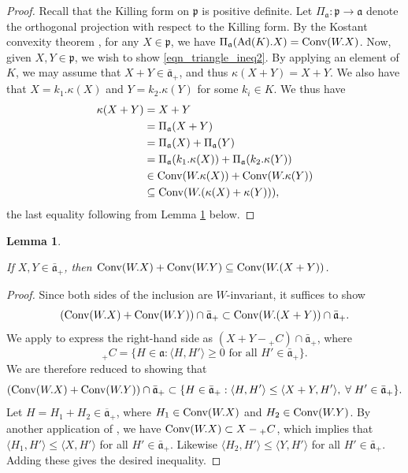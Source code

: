 \documentclass[12pt]{amsart}
\newtheorem{lemma}[theorem]{Lemma}
\theoremstyle{remark}
\newcommand{\ga}{\mathfrak a}
\begin{document}
\begin{proof}
    Recall that the Killing form on $\mathfrak{p}$ is positive definite. Let $\Pi_\ga: \mathfrak{p} \to \ga$ denote the orthogonal projection with respect to the Killing form. By the Kostant convexity theorem \cite[Theorem 8.2]{Kostant_73}, for any $X \in \mathfrak{p}$, we have $\Pi_\ga(\textnormal{Ad}(K).X) = \textnormal{Conv}(W. X)$. Now, given $X, Y \in \mathfrak{p}$, we wish to show \eqref{eqn_triangle_ineq2}. By applying an element of $K$, we may assume that $X + Y \in \bar{\ga}_+$, and thus $\kappa(X + Y) = X + Y$. We also have that $X = k_1.\kappa(X)$ and $Y = k_2.\kappa(Y)$ for some $k_i \in K$. We thus have
    \begin{align*}
        \kappa(X + Y) &= X+Y \\
                    &= \Pi_\ga(X + Y) \\
                    &= \Pi_\ga(X) + \Pi_\ga(Y) \\
                    &= \Pi_\ga(k_1.\kappa(X)) + \Pi_\ga(k_2.\kappa(Y)) \\
                    & \in \textnormal{Conv}(W.\kappa(X)) + \textnormal{Conv}(W.\kappa(Y)) \\
                    & \subseteq \textnormal{Conv}(W.(\kappa(X) + \kappa(Y))),
    \end{align*}
the last equality following from Lemma \ref{lemma:conv-sum} below.
\end{proof}

\begin{lemma}\label{lemma:conv-sum}

If $X, Y \in \bar{\ga}_+$, then $\textnormal{Conv}(W.X) + \textnormal{Conv}(W.Y) \subseteq \textnormal{Conv}(W.(X+Y))$.

\end{lemma}

\begin{proof}

Since both sides of the inclusion are $W$-invariant, it suffices to show
\[
(\textnormal{Conv}(W.X) + \textnormal{Conv}(W.Y)) \cap \bar{\ga}_+\subset \textnormal{Conv}(W.(X+Y)) \cap \bar{\ga}_+.
\]
We apply \cite[Ch. IV, \S 8, Lemma 8.3]{Helgason_00} to express the right-hand side as $(X + Y - {}_+ C) \cap \bar{\ga}_+$, where
\[
{}_+ C = \{ H \in \ga : \langle H, H' \rangle \ge 0 \text{ for all } H' \in \bar{\ga}_+ \}.
\]
We are therefore reduced to showing that
\[
(\textnormal{Conv}(W.X) + \textnormal{Conv}(W.Y)) \cap \bar{\ga}_+\subset \{H\in \bar{\ga}_+: \langle H, H' \rangle \le \langle X+Y, H' \rangle,\; \forall\; H' \in \bar{\ga}_+\}.
\]
Let $H = H_1 + H_2\in\overline{\ga}_+$, where $H_1 \in \textnormal{Conv}(W.X)$ and $H_2 \in \textnormal{Conv}(W.Y)$.  By another application of \cite[Ch. IV, \S 8, Lemma 8.3]{Helgason_00}, we have $\textnormal{Conv}(W.X) \subset X - {}_+ C$, which implies that $\langle H_1, H' \rangle \le \langle X, H' \rangle$ for all $H' \in \bar{\ga}_+$. Likewise $\langle H_2, H' \rangle \le \langle Y, H' \rangle$ for all $H' \in \bar{\ga}_+$.  Adding these gives the desired inequality.
\end{proof}
\end{document}
